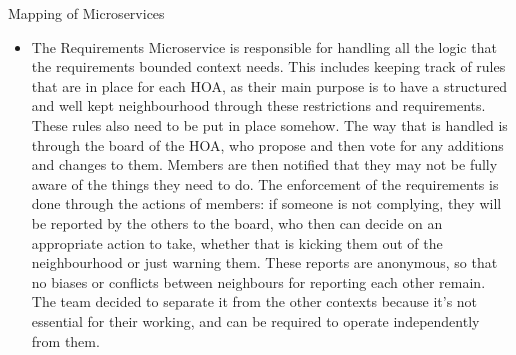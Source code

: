 \documentclass{article}
\begin{document}
\begin{section}{Mapping of Microservices }
\begin{itemize}
        \item The Requirements Microservice is responsible for handling all the logic that the requirements bounded context needs. This includes keeping track of rules that are in place for each HOA, as their main purpose is to have a structured and well kept neighbourhood through these restrictions and requirements. These rules also need to be put in place somehow. The way that is handled is through the board of the HOA, who propose and then vote for any additions and changes to them. Members are then notified that they may not be fully aware of the things they need to do. The enforcement of the requirements is done through the actions of members: if someone is not complying, they will be reported by the others to the board, who then can decide on an appropriate action to take, whether that is kicking them out of the neighbourhood or just warning them. These reports are anonymous, so that no biases or conflicts between neighbours for reporting each other remain. The team decided to separate it from the other contexts because it’s not essential for their  working, and can be required to operate independently from them.
    \end{itemize}

\end{section}
\end{document}
